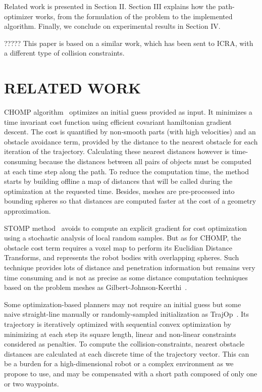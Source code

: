 \documentclass{tADR2e}
\begin{document}
Related work is presented in Section II. Section III explains how the 
path-optimizer works, from the formulation of the problem to the implemented
algorithm. Finally, we conclude on experimental results in Section IV.


????? This paper is based on a similar work, which has been sent to ICRA, with a different type of collision constraints.


\section{RELATED WORK}

CHOMP algorithm~\cite{RatliffChomp} optimizes an initial guess provided as
input. It minimizes a time invariant cost function using efficient covariant
hamiltonian gradient descent. The cost is quantified by non-smooth parts (with
high velocities) and an obstacle avoidance term, provided by the distance to the 
nearest obstacle for each iteration of the trajectory. Calculating these nearest 
distances however is time-consuming because the distances between all pairs of 
objects must be computed at each time step along the path. To reduce the 
computation time, the method starts by building offline a map of distances that 
will be called during the optimization at the requested time. Besides, meshes 
are pre-processed into bounding spheres so that distances are computed faster 
at the cost of a geometry approximation.

STOMP method~\cite{KalakrishnanStomp} avoids to compute an 
explicit gradient for cost optimization using a stochastic analysis of local 
random samples. But as for CHOMP, the obstacle cost term requires a voxel map to 
perform its Euclidian Distance Transforms, and represents the robot bodies with 
overlapping spheres. Such technique provides lots of distance and penetration 
information but remains very time consuming and is not as precise as some 
distance computation techniques based on the problem meshes as 
Gilbert-Johnson-Keerthi~\cite{gilbertGjk}.

Some optimization-based planners may not require an initial guess but some naive 
straight-line manually or randomly-sampled initialization as 
TrajOp~\cite{SchulmanConvexOptim}. Its trajectory is iteratively optimized with 
sequential convex optimization by minimizing at each step its square length, 
linear and non-linear constraints considered as penalties. To compute the 
collision-constraints, nearest obstacle distances are calculated at each discrete 
time of the trajectory vector. This can be a burden for a high-dimensional robot 
or a complex environment as we propose to use, and may be compensated with a 
short path composed of only one or two waypoints.
\end{document}
